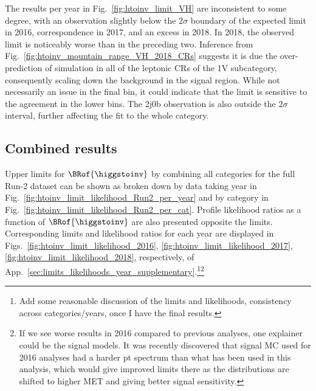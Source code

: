 The results per year in Fig.~\ref{fig:htoinv_limit_VH} are inconsistent to some degree, with an observation slightly below the $\text{2}\sigma$ boundary of the expected limit in 2016, correspondence in 2017, and an excess in 2018. In 2018, the observed limit is noticeably worse than in the preceding two. Inference from Fig.~\ref{fig:htoinv_mountain_range_VH_2018_CRs} suggests it is due the over-prediction of simulation in all of the leptonic \glspl{CR} of the 1V subcategory, consequently scaling down the background in the signal region. While not necessarily an issue in the final \ptmiss bin, it could indicate that the limit is sensitive to the agreement in the lower bins. The 2j0b observation is also outside the $\text{2}\sigma$ interval, further affecting the fit to the whole category.

\clearpage




\subsection{Combined results}
\label{subsec:htoinv_combined_results}

Upper limits for $\BRof{\higgstoinv}$ by combining all categories for the full Run-2 dataset can be shown as broken down by data taking year in Fig.~\ref{fig:htoinv_limit_likelihood_Run2_per_year} and by category in Fig.~\ref{fig:htoinv_limit_likelihood_Run2_per_cat}. Profile likelihood ratios as a function of $\BRof{\higgstoinv}$ are also presented opposite the limits. Corresponding limits and likelihood ratios for each year are displayed in Figs.~\ref{fig:htoinv_limit_likelihood_2016}, \ref{fig:htoinv_limit_likelihood_2017}, \ref{fig:htoinv_limit_likelihood_2018}, respectively, of App.~\ref{sec:limits_likelihoods_year_supplementary}.\footnote{Add some reasonable discussion of the limits and likelihoods, consistency across categories/years, once I have the final results.}\footnote{If we see worse results in 2016 compared to previous analyses, one explainer could be the signal models. It was recently discovered that signal MC used for 2016 analyses had a harder pt spectrum than what has been used in this analysis, which would give improved limits there as the distributions are shifted to higher MET and giving better signal sensitivity.}

